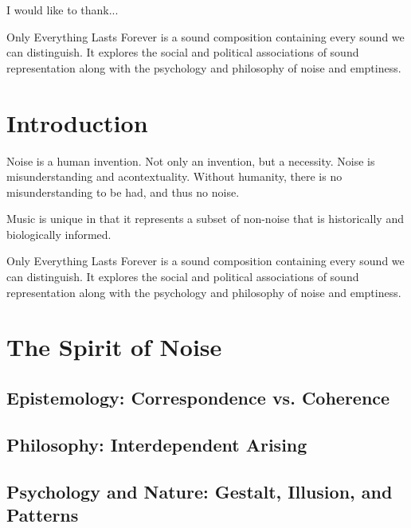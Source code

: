 \documentclass{thesis}
\author{Kyle McDonald}
\begin{document}
 
\titlepage %
\tableofcontents

I would like to thank...

Only Everything Lasts Forever is a sound composition containing every sound we can distinguish. It explores the social and political associations of sound representation along with the psychology and philosophy of noise and emptiness.

\chapter{Introduction}

Noise is a human invention. Not only an invention, but a necessity. Noise is misunderstanding and acontextuality. Without humanity, there is no misunderstanding to be had, and thus no noise.

Music is unique in that it represents a subset of non-noise that is historically and biologically informed.

Only Everything Lasts Forever is a sound composition containing every sound we can distinguish. It explores the social and political associations of sound representation along with the psychology and philosophy of noise and emptiness.

\chapter{The Spirit of Noise}
\section{Epistemology: Correspondence vs. Coherence}
	\cite{Blackburn07}\cite{seti_about_????}\cite{david_correspondence_????}\cite{david_horvitz_flickr:_????}
	\cite{david_horvitz_flickr:_????-1}\cite{young_coherence_????}
\section{Philosophy: Interdependent Arising}
	\cite{Hofstadter07}\cite{Koller01}\cite{erik_thiele_tempest_????}\cite{francesco_vianello_reality_????}
	\cite{w._wayt_gibbs_hackers_2009}
\section{Psychology and Nature: Gestalt, Illusion, and Patterns}
	\cite{Moore07}\cite{Doczi81}\cite{Hofstadter01}\cite{robin_mckie_secret_2004}
	\cite{alan_dunning_paul_woodrow_and_morley_hollenberg_einsteins_2008}\cite{alexander_bogomolny_kanizsa_????}
	\cite{brian_dunning_facemars_2008}\cite{dan_paluska_holy_2005}\cite{de_lapparent_slice_1986}
	\cite{jochem_van_der_spek_no_2001}\cite{jonathan_feinberg_haiku_????}\cite{michael_bach_dalmatian_2002}
	\cite{michael_m._ross_natural_2007}\cite{padovan_proportion_1999}\cite{rips_equidistant_1994}
	\cite{weisstein_prime_????}\cite{boston.com_religious_????}
\end{document}
